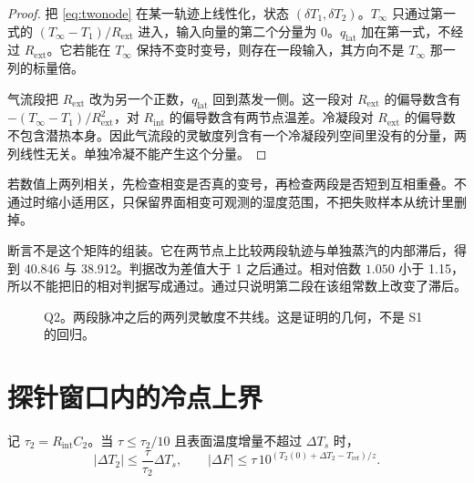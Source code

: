 \begin{proof}
把 \eqref{eq:twonode} 在某一轨迹上线性化，状态 \((\delta T_1,\delta T_2)\)。\(T_\infty\) 只通过第一式的 \((T_\infty-T_1)/R_{\mathrm{ext}}\) 进入，输入向量的第二个分量为 0。\(q_{\mathrm{lat}}\) 加在第一式，不经过 \(R_{\mathrm{ext}}\)。它若能在 \(T_\infty\) 保持不变时变号，则存在一段输入，其方向不是 \(T_\infty\) 那一列的标量倍。

气流段把 \(R_{\mathrm{ext}}\) 改为另一个正数，\(q_{\mathrm{lat}}\) 回到蒸发一侧。这一段对 \(R_{\mathrm{ext}}\) 的偏导数含有 \(-(T_\infty-T_1)/R_{\mathrm{ext}}^2\)，对 \(R_{\mathrm{int}}\) 的偏导数含有两节点温差。冷凝段对 \(R_{\mathrm{ext}}\) 的偏导数不包含潜热本身。因此气流段的灵敏度列含有一个冷凝段列空间里没有的分量，两列线性无关。单独冷凝不能产生这个分量。
\end{proof}

若数值上两列相关，先检查相变是否真的变号，再检查两段是否短到互相重叠。不通过时缩小适用区，只保留界面相变可观测的湿度范围，不把失败样本从统计里删掉。

断言不是这个矩阵的组装。它在两节点上比较两段轨迹与单独蒸汽的内部滞后，得到 40.846 与 38.912。判据改为差值大于 1 之后通过。相对倍数 \(1.050\) 小于 1.15，所以不能把旧的相对判据写成通过。通过只说明第二段在该组常数上改变了滞后。

\begin{figure}[ht]
\centering
{}
\caption{Q2。两段脉冲之后的两列灵敏度不共线。这是证明的几何，不是 S1 的回归。}
\end{figure}

\section{探针窗口内的冷点上界}

\begin{proposition}[冷点增量]
\label{prop:budget}
记 \(\tau_2=R_{\mathrm{int}}C_2\)。当 \(\tau\le\tau_2/10\) 且表面温度增量不超过 \(\Delta T_s\) 时，
\begin{equation}
|\Delta T_2|\le\frac{\tau}{\tau_2}\Delta T_s,
\qquad
|\Delta F|\le\tau\,10^{(T_2(0)+\Delta T_2-T_{\mathrm{ref}})/z}.
\end{equation}
\end{proposition}

